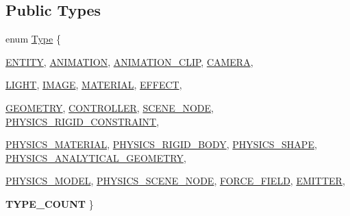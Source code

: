 \subsection*{Public Types}
\begin{DoxyCompactItemize}
\item 
enum \hyperlink{classFCDEntity_a9301a4bd5f4d4190ec13e40db4effdd7}{Type} \{ \par
\hyperlink{classFCDEntity_a9301a4bd5f4d4190ec13e40db4effdd7ad3c81776d7cbf8bc30f5a92aa1cdc6af}{ENTITY}, 
\hyperlink{classFCDEntity_a9301a4bd5f4d4190ec13e40db4effdd7ad056f9a0c0836aa9add7e10969736fd5}{ANIMATION}, 
\hyperlink{classFCDEntity_a9301a4bd5f4d4190ec13e40db4effdd7a71cf4ef98b4af310de2fca7cfd3c6b63}{ANIMATION\_\-CLIP}, 
\hyperlink{classFCDEntity_a9301a4bd5f4d4190ec13e40db4effdd7a079dc3be01f63d3552374a7717f23f8f}{CAMERA}, 
\par
\hyperlink{classFCDEntity_a9301a4bd5f4d4190ec13e40db4effdd7aeaff98f940446b32b452289b0a79de71}{LIGHT}, 
\hyperlink{classFCDEntity_a9301a4bd5f4d4190ec13e40db4effdd7a9ad49c80c980e901cfefb18e037fce81}{IMAGE}, 
\hyperlink{classFCDEntity_a9301a4bd5f4d4190ec13e40db4effdd7af0658dd0aa3b5a1b0c5e3dc44c5d763c}{MATERIAL}, 
\hyperlink{classFCDEntity_a9301a4bd5f4d4190ec13e40db4effdd7a25776f0c3122d297fd3b6026618d50af}{EFFECT}, 
\par
\hyperlink{classFCDEntity_a9301a4bd5f4d4190ec13e40db4effdd7a99b17e5e6e7e9cdcb353bad7ff811c85}{GEOMETRY}, 
\hyperlink{classFCDEntity_a9301a4bd5f4d4190ec13e40db4effdd7ad1448b2688394292605bed327a679afe}{CONTROLLER}, 
\hyperlink{classFCDEntity_a9301a4bd5f4d4190ec13e40db4effdd7ad56e9eb11f4aa44893f27411ac9a2455}{SCENE\_\-NODE}, 
\hyperlink{classFCDEntity_a9301a4bd5f4d4190ec13e40db4effdd7a026283951793084a7a849e508857d603}{PHYSICS\_\-RIGID\_\-CONSTRAINT}, 
\par
\hyperlink{classFCDEntity_a9301a4bd5f4d4190ec13e40db4effdd7ae754a84e2c8b4c525e8207e0a971b89c}{PHYSICS\_\-MATERIAL}, 
\hyperlink{classFCDEntity_a9301a4bd5f4d4190ec13e40db4effdd7a9bc7a8ae178d5f9cb06111b4d51240d0}{PHYSICS\_\-RIGID\_\-BODY}, 
\hyperlink{classFCDEntity_a9301a4bd5f4d4190ec13e40db4effdd7ad4b1f4af3fdb3f4b7a0188437749baf7}{PHYSICS\_\-SHAPE}, 
\hyperlink{classFCDEntity_a9301a4bd5f4d4190ec13e40db4effdd7a84bd56ee18a6f6e1118f89078714a761}{PHYSICS\_\-ANALYTICAL\_\-GEOMETRY}, 
\par
\hyperlink{classFCDEntity_a9301a4bd5f4d4190ec13e40db4effdd7acc96ac70dd041d7bf674e18c11d628af}{PHYSICS\_\-MODEL}, 
\hyperlink{classFCDEntity_a9301a4bd5f4d4190ec13e40db4effdd7a3f3aa51d0684a57da181845722e8cc1f}{PHYSICS\_\-SCENE\_\-NODE}, 
\hyperlink{classFCDEntity_a9301a4bd5f4d4190ec13e40db4effdd7a82f3b68df09fcd2bc6ba839b41e01b58}{FORCE\_\-FIELD}, 
\hyperlink{classFCDEntity_a9301a4bd5f4d4190ec13e40db4effdd7ab6f994b7aaba9add07d533f8945ddb70}{EMITTER}, 
\par
{\bfseries TYPE\_\-COUNT}
 \}
\end{DoxyCompactItemize}
